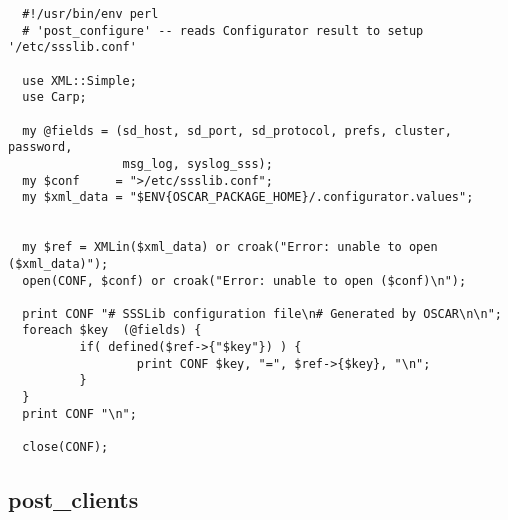 \begin{scriptsize}
\begin{verbatim}
  #!/usr/bin/env perl
  # 'post_configure' -- reads Configurator result to setup '/etc/ssslib.conf'

  use XML::Simple;
  use Carp;

  my @fields = (sd_host, sd_port, sd_protocol, prefs, cluster, password, 
                msg_log, syslog_sss);
  my $conf     = ">/etc/ssslib.conf";
  my $xml_data = "$ENV{OSCAR_PACKAGE_HOME}/.configurator.values";


  my $ref = XMLin($xml_data) or croak("Error: unable to open ($xml_data)");
  open(CONF, $conf) or croak("Error: unable to open ($conf)\n");

  print CONF "# SSSLib configuration file\n# Generated by OSCAR\n\n";
  foreach $key  (@fields) {
          if( defined($ref->{"$key"}) ) {
                  print CONF $key, "=", $ref->{$key}, "\n";
          }
  }
  print CONF "\n";

  close(CONF);
\end{verbatim}
\end{scriptsize}



\subsection{post\_clients}

